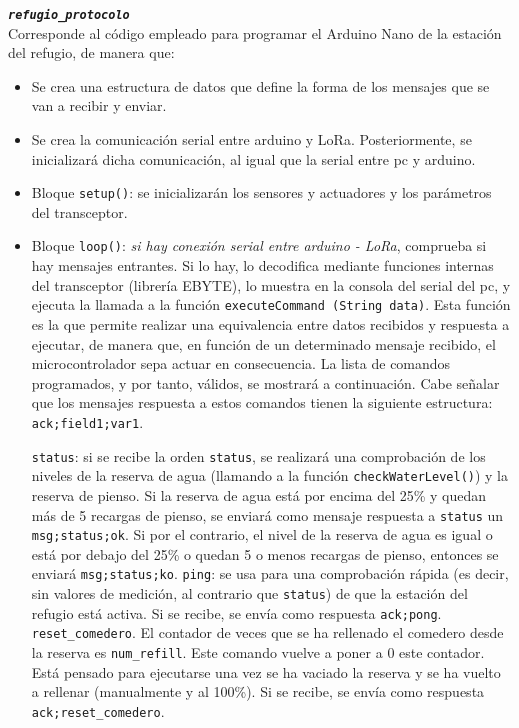 \documentclass[12pt]{article}
\begin{document}
	\noindent \textbf{\texttt{\textit{refugio\_protocolo}}} \\
	
	\noindent Corresponde al código empleado para programar el Arduino Nano de la estación del refugio, de manera que: 
	
	\begin{itemize}
		\item Se crea una estructura de datos que define la forma de los mensajes que se van a recibir y enviar.
		\item Se crea la comunicación serial entre arduino y LoRa. Posteriormente, se inicializará dicha comunicación, al igual que la serial entre pc y arduino.
		\item Bloque \texttt{setup()}: se inicializarán los sensores y actuadores y los parámetros del transceptor.
		\item Bloque \texttt{loop()}: \textit{si hay conexión serial entre arduino - LoRa}, comprueba si hay mensajes entrantes. Si lo hay, lo decodifica mediante funciones internas del transceptor (librería EBYTE), lo muestra en la consola del serial del pc, y ejecuta la llamada a la función \texttt{executeCommand (String data)}. Esta función es la que permite realizar una equivalencia entre datos recibidos y respuesta a ejecutar, de manera que, en función de un determinado mensaje recibido, el microcontrolador sepa actuar en consecuencia. La lista de comandos programados, y por tanto, válidos, se mostrará a continuación. Cabe señalar que los mensajes respuesta a estos comandos tienen la siguiente estructura: \texttt{ack;field1;var1}.
			\begin{outline}
				\1 \texttt{status}: si se recibe la orden \texttt{status}, se realizará una comprobación de los niveles de la reserva de agua (llamando a la función \texttt{checkWaterLevel()}) y la reserva de pienso. Si la reserva de agua está por encima del 25\% y quedan más de 5 recargas de pienso, se enviará como mensaje respuesta a \texttt{status} un \texttt{msg;status;ok}. Si por el contrario, el nivel de la reserva de agua es igual o está por debajo del 25\% o quedan 5 o menos recargas de pienso, entonces se enviará \texttt{msg;status;ko}. 
				\1 \texttt{ping}: se usa para una comprobación rápida (es decir, sin valores de medición, al contrario que \texttt{status}) de que la estación del refugio está activa. Si se recibe, se envía como respuesta \texttt{ack;pong}.
				\1 \texttt{reset\_comedero}. El contador de veces que se ha rellenado el comedero desde la reserva es \texttt{num\_refill}. Este comando vuelve a poner a 0 este contador. Está pensado para ejecutarse una vez se ha vaciado la reserva y se ha vuelto a rellenar (manualmente y al 100\%). Si se recibe, se envía como respuesta \texttt{ack;reset\_comedero}.

\end{outline}
\end{itemize}
\end{document}
